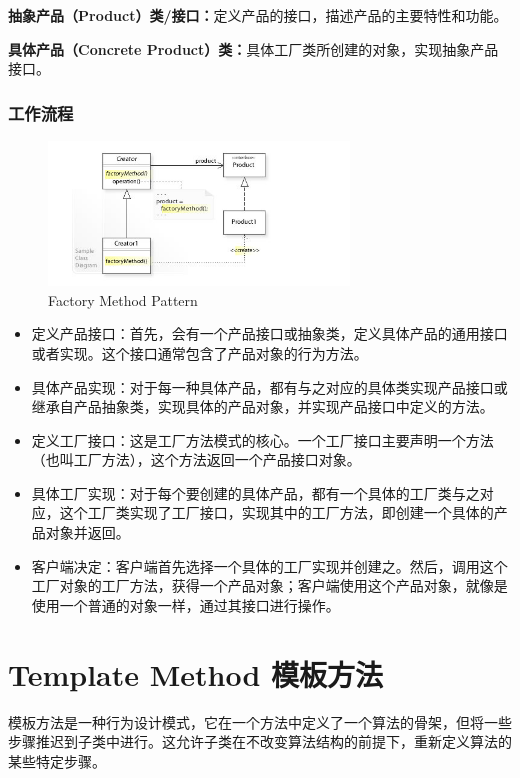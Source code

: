 \textbf{抽象产品（Product）类/接口：}定义产品的接口，描述产品的主要特性和功能。

\textbf{具体产品（Concrete Product）类：}具体工厂类所创建的对象，实现抽象产品接口。

\subsubsection{工作流程}

\begin{figure}[h]
    \centering
    \includegraphics[width=8cm]{res/Factory-Method-UML.jpg}
    \caption{Factory Method Pattern}
\end{figure}
\begin{itemize}
	\item 定义产品接口：首先，会有一个产品接口或抽象类，定义具体产品的通用接口或者实现。这个接口通常包含了产品对象的行为方法。
	\item 具体产品实现：对于每一种具体产品，都有与之对应的具体类实现产品接口或继承自产品抽象类，实现具体的产品对象，并实现产品接口中定义的方法。
	\item 定义工厂接口：这是工厂方法模式的核心。一个工厂接口主要声明一个方法（也叫工厂方法），这个方法返回一个产品接口对象。
	\item 具体工厂实现：对于每个要创建的具体产品，都有一个具体的工厂类与之对应，这个工厂类实现了工厂接口，实现其中的工厂方法，即创建一个具体的产品对象并返回。
	\item 客户端决定：客户端首先选择一个具体的工厂实现并创建之。然后，调用这个工厂对象的工厂方法，获得一个产品对象；客户端使用这个产品对象，就像是使用一个普通的对象一样，通过其接口进行操作。
\end{itemize}

\section{Template Method 模板方法}

模板方法是一种行为设计模式，它在一个方法中定义了一个算法的骨架，但将一些步骤推迟到子类中进行。这允许子类在不改变算法结构的前提下，重新定义算法的某些特定步骤。

